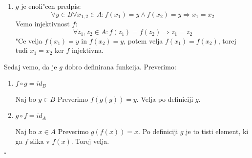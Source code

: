 \begin{itemize}
\begin{enumerate}
		\item $g$ je enoli"cen predpis:
		\begin{equation*}
		\forall y \in B \forall x_{1,2} \in A: f(x_1) = y \land f(x_2) = y \Rightarrow x_1 = x_2
		\end{equation*}
		Vemo injektivnost $f$: 
		\begin{equation*}
		\forall z_1, z_2 \in A: f(z_1) = f(z_2) \Rightarrow z_1 = z_2
		\end{equation*}
		"Ce velja $f(x_1) = y$ in $f(x_2) = y$, potem velja $f(x_1) = f(x_2)$, torej tudi $x_1 = x_2$ ker $f$ injektivna.
	\end{enumerate}
	Sedaj vemo, da je $g$ dobro definirana funkcija. Preverimo:
	\begin{enumerate}
		\item $f \circ g = id_B$
		
		Naj bo $y \in B$ Preverimo $f(g(y)) = y$. Velja po definiciji $g$.
		
		\item $g \circ f = id_A$
		
		Naj bo $x \in A$ Preverimo $g(f(x)) = x$. Po definiciji $g$ je to tisti element, ki ga $f$ slika v $f(x)$. Torej velja.
	\end{enumerate}
\hfill $\square$
\end{itemize}
